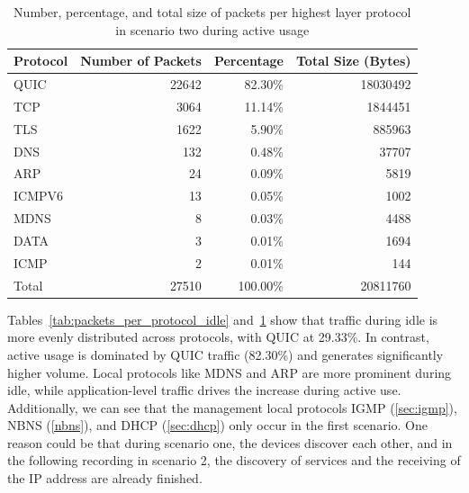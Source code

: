 \documentclass[sigconf,nonacm]{acmart}
\begin{document}
\begin{table}[ht]
\centering
\caption{Number, percentage, and total size of packets per highest layer protocol in scenario two during active usage}
\begin{tabular}{lrrr}
\toprule
Protocol & Number of Packets & Percentage & Total Size (Bytes) \\
\midrule
QUIC & 22642 & 82.30\% & 18030492 \\
TCP & 3064 & 11.14\% & 1844451 \\
TLS & 1622 & 5.90\% & 885963 \\
DNS & 132 & 0.48\% & 37707 \\
ARP & 24 & 0.09\% & 5819 \\
ICMPV6 & 13 & 0.05\% & 1002 \\
MDNS & 8 & 0.03\% & 4488 \\
DATA & 3 & 0.01\% & 1694 \\
ICMP & 2 & 0.01\% & 144 \\
\midrule
Total & 27510 & 100.00\% & 20811760 \\
\bottomrule
\end{tabular}
\label{tab:packets_per_protocol_active}
\end{table}


Tables~\ref{tab:packets_per_protocol_idle} and~\ref{tab:packets_per_protocol_active} show that traffic during idle is more evenly distributed across protocols, with QUIC at 29.33\%. In contrast, active usage is dominated by QUIC traffic (82.30\%) and generates significantly higher volume. Local protocols like MDNS and ARP are more prominent during idle, while application-level traffic drives the increase during active use. Additionally, we can see that the management local protocols IGMP (\cref{sec:igmp}), NBNS (\cref{nbns}), and DHCP (\cref{sec:dhcp}) only occur in the first scenario. One reason could be that during scenario one, the devices discover each other, and in the following recording in scenario 2, the discovery of services and the receiving of the IP address are already finished.


 
\end{document}
